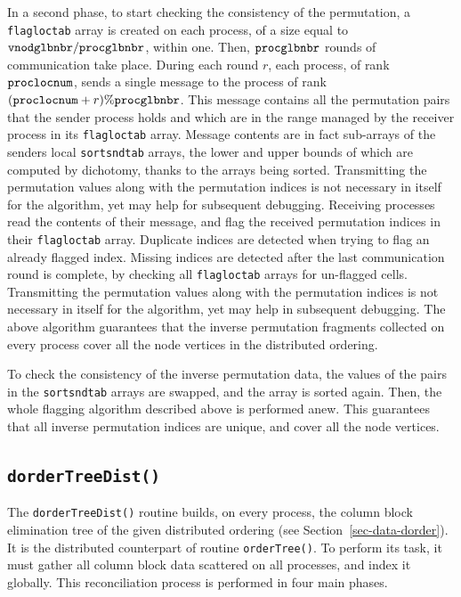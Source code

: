 In a second phase, to start checking the consistency of the
permutation, a \texttt{flag\lbt loc\lbt tab} array is created on each
process, of a size equal to
$\mathtt{vnod\lbt glb\lbt nbr} / \mathtt{proc\lbt glb\lbt nbr}$,
within one. Then, $\mathtt{proc\lbt glb\lbt nbr}$ rounds of
communication take place. During each round $r$, each process,
of rank $\mathtt{proc\lbt loc\lbt num}$, sends a single message to the
process of rank
$(\mathtt{proc\lbt loc\lbt num} + r) \% \mathtt{proc\lbt glb\lbt nbr}$.
This message contains all the permutation pairs that the sender
process holds and which are in the range managed by the receiver
process in its \texttt{flag\lbt loc\lbt tab} array. Message contents
are in fact sub-arrays of the senders local
\texttt{sort\lbt snd\lbt tab} arrays, the lower and upper bounds of
which are computed by dichotomy, thanks to the arrays being
sorted.
Transmitting the permutation values along with the permutation indices
is not necessary in itself for the algorithm, yet may help for
subsequent debugging.
Receiving processes read the contents of their message, and flag the
received permutation indices in their \texttt{flag\lbt loc\lbt tab}
array.
Duplicate indices are detected when trying to flag an already flagged
index. Missing indices are detected after the last communication round
is complete, by checking all \texttt{flag\lbt loc\lbt tab} arrays for
un-flagged cells.
Transmitting the permutation values along with the permutation indices
is not necessary in itself for the algorithm, yet may help in
subsequent debugging.
The above algorithm guarantees that the inverse permutation fragments
collected on every process cover all the node vertices in the
distributed ordering.

To check the consistency of the inverse permutation data, the values
of the pairs in the \texttt{sort\lbt snd\lbt tab} arrays are swapped,
and the array is sorted again. Then, the whole flagging algorithm
described above is performed anew. This guarantees that all inverse
permutation indices are unique, and cover all the node vertices.

\subsection{\texttt{dorderTreeDist()}}

The \texttt{dorderTreeDist()} routine builds, on every process, the
column block elimination tree of the given distributed ordering (see
Section~\ref{sec-data-dorder}). It is the distributed counterpart of
routine \texttt{orderTree()}. To perform its task, it must gather all
column block data scattered on all processes, and index it
globally. This reconciliation process is performed in four main
phases.

